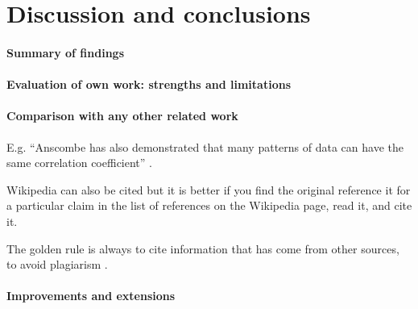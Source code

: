 \documentclass[10pt,a4paper,twocolumn]{article}
\begin{document}
\section{Discussion and conclusions}

\paragraph{Summary of findings}

\paragraph{Evaluation of own work: strengths and limitations}

\paragraph{Comparison with any other related work}
E.g. ``Anscombe has also demonstrated that many patterns of data can
have the same correlation coefficient'' \cite{anscombe1973graphs}.

Wikipedia can also be cited but it is better if you find the original
reference it for a particular claim in the list of references on the
Wikipedia page, read it, and cite it.

The golden rule is always to cite information that has come from other
sources, to avoid plagiarism \cite{wiki:plagarism}. \cite{HowMuchDoesEloMatter}

\paragraph{Improvements and extensions}

\printbibliography
\end{document}
